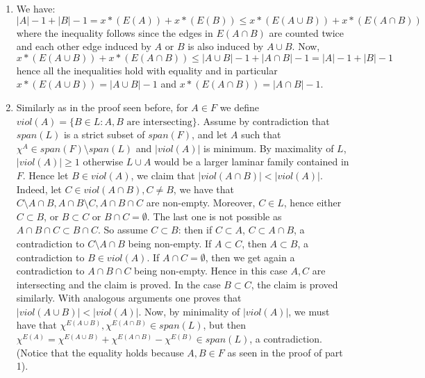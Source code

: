 \documentclass[11pt]{article}
\begin{document}
\begin{enumerate}[1)]
\begin{solution}
\begin{enumerate}
\item We have:
$$|A|−1 + |B|−1 = x*(E(A)) + x*(E(B)) ≤x*(E(A∪B)) + x*(E(A∩B))$$
where the inequality follows since the edges in $E(A∩B)$ are counted twice and each other
edge induced by $A$ or $B$ is also induced by $A∪B$. Now,
$$x*(E(A∪B)) + x*(E(A∩B)) ≤|A∪B|−1 + |A∩B|−1 = |A|−1 + |B|−1$$
hence all the inequalities hold with equality and in particular $x*(E(A∪B)) = |A∪B|−1$ and
$x*(E(A∩B)) = |A∩B|−1$.
\item  Similarly as in the proof seen before, for $A ∈ F$ we define $viol(A) = \{B ∈ L : A,B
\text{ are intersecting}\}$. Assume by contradiction that $span(L)$ is a strict subset of $span(F)$, and
let $A$ such that $χ^A ∈span(F) \setminus span(L)$ and $|viol(A)|$ is minimum. By maximality of $L$,
$|viol(A)|≥1$ otherwise $L∪A$ would be a larger laminar family contained in $F$. Hence let
$B ∈viol(A)$, we claim that $|viol(A∩B)|< |viol(A)|$. Indeed, let $C ∈viol(A∩B), C\neq B$,
we have that $C\setminus A∩B,A∩B\setminus C,A∩B∩C$ are non-empty. Moreover, $C ∈L$, hence either
$C ⊂B$, or $B ⊂C$ or $B∩C= \emptyset$. The last one is not possible as $A∩B∩C ⊂B∩C$. So assume
$C ⊂B$: then if $C ⊂A$, $C ⊂A∩B$, a contradiction to $C\setminus A∩B$ being non-empty. If $A⊂C$,
then $A⊂B$, a contradiction to $B ∈viol(A)$. If $A∩C= \emptyset$, then we get again a contradiction
to $A∩B ∩C$ being non-empty. Hence in this case $A,C$ are intersecting and the claim is
proved. In the case $B ⊂C$, the claim is proved similarly. With analogous arguments one
proves that $|viol(A∪B)|< |viol(A)|$. Now, by minimality of $|viol(A)|$, we must have that
$χ^{E(A∪B)},χ^{E(A∩B)} ∈span(L)$, but then $χ^{E(A)} = χ^{E(A∪B)} + χ^{E(A∩B)}−χ^{E(B)} ∈span(L)$, a
contradiction. (Notice that the equality holds because $A,B ∈F$ as seen in the proof of part
1).
\end{enumerate}
\end{solution}






\end{enumerate}



  
\end{document}
